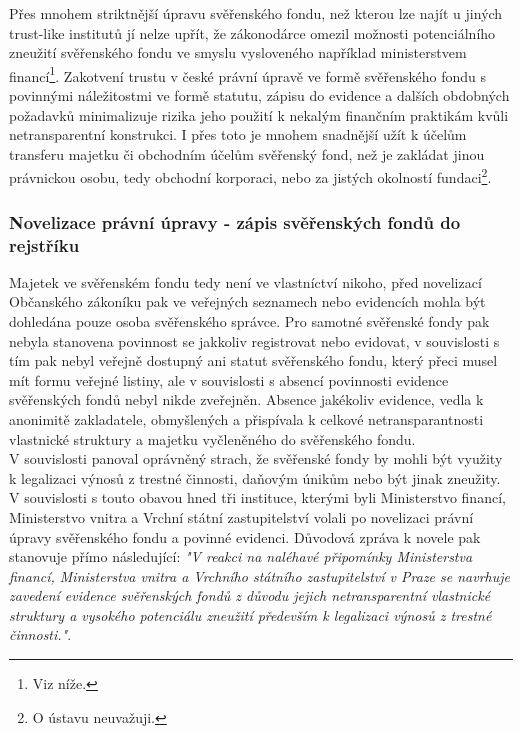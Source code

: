 \documentclass{article}
\begin{document}
Přes mnohem striktnější úpravu svěřenského fondu, než kterou lze najít u jiných trust-like institutů jí nelze upřít, že zákonodárce omezil možnosti potenciálního zneužití svěřenského fondu ve smyslu vysloveného například ministerstvem financí\footnote{Viz níže.}. Zakotvení trustu v české právní úpravě ve formě svěřenského fondu s povinnými náležitostmi ve formě statutu, zápisu do evidence a dalších obdobných požadavků minimalizuje rizika jeho použití k nekalým finančním praktikám kvůli netransparentní konstrukci. I přes toto je mnohem snadnější užít k účelům transferu majetku či obchodním účelům svěřenský fond, než je zakládat jinou právnickou osobu, tedy obchodní korporaci, nebo za jistých okolností fundaci\footnote{O ústavu neuvažuji.}.\\

\subsubsection{Novelizace právní úpravy - zápis svěřenských fondů do rejstříku}

Majetek ve svěřenském fondu tedy není ve vlastníctví nikoho, před novelizací Občanského zákoníku pak ve veřejných seznamech nebo evidencích mohla být dohledána pouze osoba svěřenského správce. Pro samotné svěřenské fondy pak nebyla stanovena povinnost se jakkoliv registrovat nebo evidovat, v souvislosti s tím pak nebyl veřejně dostupný ani statut svěřenského fondu, který přeci musel mít formu veřejné listiny, ale v souvislosti s absencí povinnosti evidence svěřenských fondů nebyl nikde zveřejněn. Absence jakékoliv evidence, vedla k anonimitě zakladatele, obmyšlených a přispívala k celkové netransparantnosti vlastnické struktury a majetku vyčleněného do svěřenského fondu.\\

V souvislosti panoval oprávněný strach, že svěřenské fondy by mohli být využity k legalizaci výnosů z trestné činnosti, daňovým únikům nebo být jinak zneužity. V souvislosti s touto obavou hned tři instituce, kterými byli Ministerstvo financí, Ministerstvo vnitra a Vrchní státní zastupitelství volali po novelizaci právní úpravy svěřenského fondu a povinné evidenci. Důvodová zpráva k novele pak stanovuje přímo následující: \textit{"V reakci na naléhavé připomínky Ministerstva financí, Ministerstva vnitra a Vrchního státního zastupitelství v Praze se navrhuje zavedení evidence svěřenských fondů z důvodu jejich netransparentní vlastnické struktury a vysokého potenciálu zneužití především k legalizaci výnosů z trestné činnosti."}.\\
\end{document}
